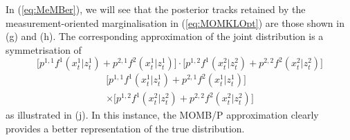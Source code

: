 \documentclass[journal,twoside]{IEEEtran}
\theoremstyle{plain}
\begin{document}
In (\ref{eq:MeMBer}), we will see that the posterior tracks retained by the measurement-oriented marginalisation in (\ref{eq:MOMKLOpt}) are those shown in (g) and (h). The corresponding approximation of the joint distribution is a symmetrisation of
%
\ifCLASSOPTIONdraftcls
\[
\big[p^{1,1}f^1(x_t^1|z_t^1) + p^{2,1}f^2(x_t^1|z_t^1)\big]\cdot
\big[p^{1,2}f^1(x_t^2|z_t^2) + p^{2,2}f^2(x_t^2|z_t^2)\big]
\]
\else
\begin{multline*}
\big[p^{1,1}f^1(x_t^1|z_t^1) + p^{2,1}f^2(x_t^1|z_t^1)\big]\\
\times\big[p^{1,2}f^1(x_t^2|z_t^2) + p^{2,2}f^2(x_t^2|z_t^2)\big]
\end{multline*}
\fi
%
as illustrated in (j). In this instance, the MOMB/P approximation clearly provides a better representation of the true distribution.
 
\end{document}
